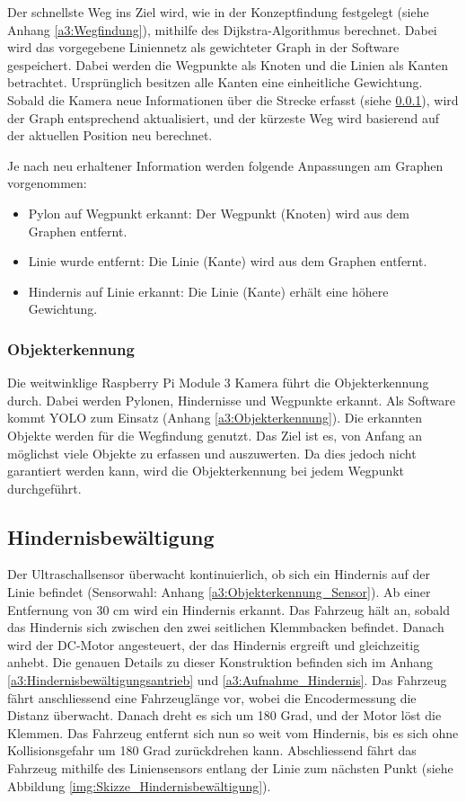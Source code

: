 \documentclass[../main.tex]{subfiles}
\begin{document}
Der schnellste Weg ins Ziel wird, wie in der Konzeptfindung festgelegt (siehe Anhang \ref{a3:Wegfindung}), mithilfe des Dijkstra-Algorithmus berechnet. Dabei wird das vorgegebene Liniennetz als gewichteter Graph in der Software gespeichert. Dabei werden die Wegpunkte als Knoten und die Linien als Kanten betrachtet. Ursprünglich besitzen alle Kanten eine einheitliche Gewichtung. Sobald die Kamera neue Informationen über die Strecke erfasst (siehe \ref{sub:Objekterkennung}), wird der Graph entsprechend aktualisiert, und der kürzeste Weg wird basierend auf der aktuellen Position neu berechnet.

Je nach neu erhaltener Information werden folgende Anpassungen am Graphen vorgenommen: \begin{itemize} 
  \item Pylon auf Wegpunkt erkannt: Der Wegpunkt (Knoten) wird aus dem Graphen entfernt.
  \item Linie wurde entfernt: Die Linie (Kante) wird aus dem Graphen entfernt. 
  \item Hindernis auf Linie erkannt: Die Linie (Kante) erhält eine höhere Gewichtung.
\end{itemize}

\subsubsection{Objekterkennung} \label{sub:Objekterkennung}
Die weitwinklige Raspberry Pi Module 3 Kamera führt die Objekterkennung durch. Dabei werden Pylonen, Hindernisse und Wegpunkte erkannt. Als Software kommt YOLO zum Einsatz (Anhang \ref{a3:Objekterkennung}). Die erkannten Objekte werden für die Wegfindung genutzt. Das Ziel ist es, von Anfang an möglichst viele Objekte zu erfassen und auszuwerten. Da dies jedoch nicht garantiert werden kann, wird die Objekterkennung bei jedem Wegpunkt durchgeführt. 

\subsection{Hindernisbewältigung}
Der Ultraschallsensor überwacht kontinuierlich, ob sich ein Hindernis auf der Linie befindet (Sensorwahl: Anhang \ref{a3:Objekterkennung_Sensor}). Ab einer Entfernung von 30 cm wird ein Hindernis erkannt. Das Fahrzeug hält an, sobald das Hindernis sich zwischen den zwei seitlichen Klemmbacken befindet. Danach wird der DC-Motor angesteuert, der das Hindernis ergreift und gleichzeitig anhebt. Die genauen Details zu dieser Konstruktion befinden sich im Anhang \ref{a3:Hindernisbewältigungsantrieb} und \ref{a3:Aufnahme_Hindernis}.
Das Fahrzeug fährt anschliessend eine Fahrzeuglänge vor, wobei die Encodermessung die Distanz überwacht. Danach dreht es sich um 180 Grad, und der Motor löst die Klemmen. Das Fahrzeug entfernt sich nun so weit vom Hindernis, bis es sich ohne Kollisionsgefahr um 180 Grad zurückdrehen kann. Abschliessend fährt das Fahrzeug mithilfe des Liniensensors entlang der Linie zum nächsten Punkt (siehe Abbildung \ref{img:Skizze_Hindernisbewältigung}).
\end{document}
